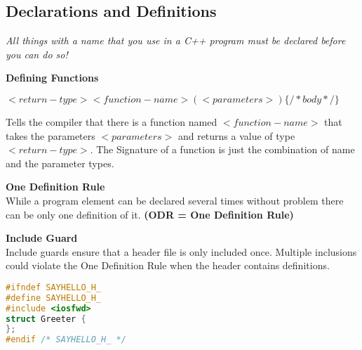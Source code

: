 \subsection{Declarations and Definitions}
\textit{All things with a name that you use in a C++ program must be declared before you can do so!}

\textbf{Defining Functions}
\begin{center}
$<return-type> <function-name> (<parameters>) \{ /* body */ \}$
\end{center}
 Tells the compiler that there is a function named $<function-name>$ that takes the parameters $<parameters>$ and returns a value of type $<return-type>$. The Signature of a function is just the combination of name and the parameter types. 
 
\textbf{One Definition Rule}\\ 
 While a program element can be declared several times without problem there can be only one definition of it. \textbf{(ODR = One Definition Rule)}
 
\textbf{Include Guard}\\
Include guards ensure that a header file is only included once. Multiple inclusions could violate the One Definition Rule when the header contains definitions.
\begin{lstlisting}[language=c++]
#ifndef SAYHELLO_H_
#define SAYHELLO_H_
#include <iosfwd>
struct Greeter {
};
#endif /* SAYHELLO_H_ */ 
\end{lstlisting}